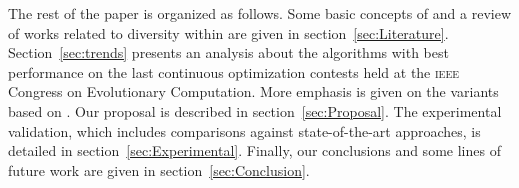 The rest of the paper is organized as follows.
%
Some basic concepts of \DE{} and a review of works related to diversity within \DE{} are given in section~\ref{sec:Literature}.
%
Section~\ref{sec:trends} presents an analysis about the algorithms with best performance on the last continuous optimization 
contests held at the \textsc{ieee} Congress on Evolutionary Computation.
%
More emphasis is given on the variants based on \DE{}.
%
Our proposal is described in section~\ref{sec:Proposal}.
%
The experimental validation, which includes comparisons against state-of-the-art approaches, is detailed in section~\ref{sec:Experimental}. 
%
Finally, our conclusions and some lines of future work are given in section~\ref{sec:Conclusion}.
